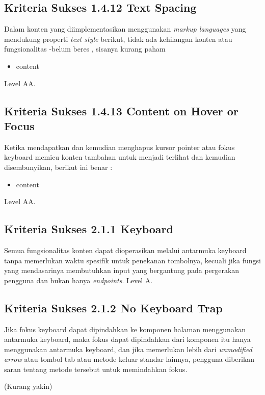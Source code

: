 \subsection{Kriteria Sukses 1.4.12 Text Spacing}
\label{sec:kriteria_1.4.12}
Dalam konten yang diimplementasikan menggunakan \textit{markup languages} yang mendukung properti \textit{text style} berikut, tidak ada kehilangan konten atau fungsionalitas 
-belum beres , sisanya kurang paham

\begin{itemize}
	\item content
\end{itemize}
Level AA.

\subsection{Kriteria Sukses 1.4.13 Content on Hover or Focus}
\label{sec:kriteria_1.4.13}
Ketika mendapatkan dan kemudian menghapus kursor pointer atau fokus keyboard memicu konten tambahan untuk menjadi terlihat dan kemudian disembunyikan, berikut ini benar :

\begin{itemize}
	\item content
\end{itemize}
Level AA.

\subsection{Kriteria Sukses 2.1.1 Keyboard}
\label{sec:kriteria_2.1.1}
Semua fungsionalitas konten dapat dioperasikan melalui antarmuka keyboard tanpa memerlukan waktu spesifik untuk penekanan tombolnya, kecuali jika fungsi yang mendasarinya membutuhkan input yang bergantung pada pergerakan pengguna dan bukan hanya \textit{endpoints}.
Level A.

\subsection{Kriteria Sukses 2.1.2 No Keyboard Trap}
\label{sec:kriteria_2.1.2}
Jika fokus keyboard dapat dipindahkan ke komponen halaman menggunakan antarmuka keyboard, maka fokus dapat dipindahkan dari komponen itu hanya menggunakan antarmuka keyboard, dan jika memerlukan lebih dari \textit{unmodified arrow} atau tombol tab atau metode keluar standar lainnya, pengguna diberikan saran tentang metode tersebut untuk memindahkan fokus.

(Kurang yakin)

